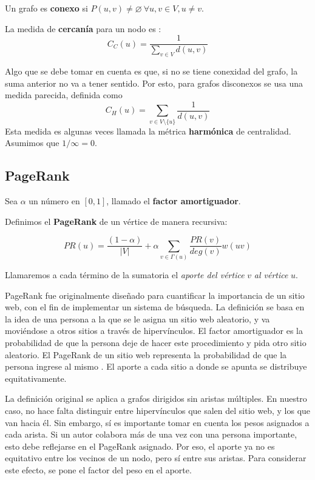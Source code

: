\documentclass[journal]{IEEEtran}
\begin{document}
Un grafo es \textbf{conexo} si \(P(u, v) \neq \varnothing~\forall u, v \in V, u \neq v\).

La medida de \textbf{cercanía} para un nodo es \cite{brandes}:
\begin{equation} \label{eq:close}
C_C (u) = \frac{1}{\sum_{v \in V} d(u, v)}
\end{equation}

Algo que se debe tomar en cuenta es que, si no se tiene conexidad del grafo, la suma anterior no va a tener sentido. Por esto, para grafos disconexos se usa una medida parecida, definida como
\begin{equation}
C_H (u) = \sum_{v \in V \setminus \{u\}} \frac{1}{d(u, v)}
\end{equation}
Esta medida es algunas veces llamada la métrica \textbf{harmónica} de centralidad\cite{rochat}. Asumimos que \(1/\infty = 0\).

\subsection{PageRank}

Sea \(\alpha\) un número en \([0, 1]\), llamado el \textbf{factor amortiguador}.

Definimos el \textbf{PageRank} de un vértice de manera recursiva:

\begin{equation} \label{eq:pagerank}
	PR(u) = \frac{(1-\alpha)}{|V|} + \alpha \sum_{v \in \Gamma(u)} \frac{PR(v)}{deg(v)} w(uv)
\end{equation}

Llamaremos a cada término de la sumatoria el \textit{aporte del vértice} \(v\) \textit{al vértice} \(u\).

PageRank fue originalmente diseñado para cuantificar la importancia de un sitio web, con el fin de implementar un sistema de búsqueda. La definición se basa en la idea de una persona a la que se le asigna un sitio web aleatorio, y va moviéndose a otros sitios a través de hipervínculos. El factor amortiguador es la probabilidad de que la persona deje de hacer este procedimiento y pida otro sitio aleatorio. El PageRank de un sitio web representa la probabilidad de que la persona ingrese al mismo \cite{google}. El aporte a cada sitio a donde se apunta se distribuye equitativamente.

La definición original se aplica a grafos dirigidos sin aristas múltiples. En nuestro caso, no hace falta distinguir entre hipervínculos que salen del sitio web, y los que van hacia él. Sin embargo, sí es importante tomar en cuenta los pesos asignados a cada arista. Si un autor colabora más de una vez con una persona importante, esto debe reflejarse en el PageRank asignado. Por eso, el aporte ya no es equitativo entre los vecinos de un nodo, pero sí entre sus aristas. Para considerar este efecto, se pone el factor del peso en el aporte.
\end{document}
